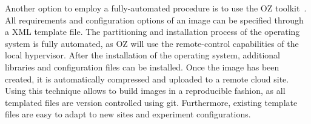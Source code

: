 Another option to employ a fully-automated procedure is to use the OZ toolkit~\cite{OZ}. All requirements and configuration options of an image can be specified through a XML template file. The partitioning and installation process of the operating system is fully automated, as OZ will use the remote-control capabilities of the local hypervisor. After the installation of the operating system, additional libraries and configuration files can be installed. Once the image has been created, it is automatically compressed and uploaded to a remote cloud site.
Using this technique allows to build images in a reproducible fashion, as all templated files are version controlled using git. Furthermore, existing template files are easy to adapt to new sites and experiment configurations.
